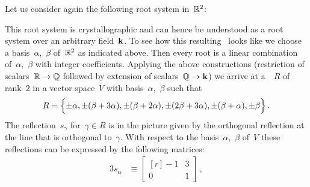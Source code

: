 \begin{example}
  Let us consider again the following root system in~$\mathbb{R}^2$:
  \begin{center}
  \end{center}
  This root system is crystallographic and can hence be understood as a root system over an arbitrary field~$\kf$.
  To see how this resulting~{\rootsystem{$\kf$}} looks like we choose a basis~$\alpha$,~$\beta$ of~$\mathbb{R}^2$ as indicated above.
  Then every root is a linear combination of~$\alpha$,~$\beta$ with integer coefficients.
  Applying the above constructions (restriction of scalars~$\mathbb{R} \to \mathbb{Q}$ followed by extension of scalars~$\mathbb{Q} \to \mathbf{k}$) we arrive at a~{\rootsystem{$\kf$}}~$R$ of rank~$2$ in a vector space~$V$ with basis~$\alpha$,~$\beta$ such that
  \[
    R
    =
    \Bigl\{
      \pm \alpha,
      \pm (\beta + 3 \alpha),
      \pm (\beta + 2 \alpha),
      \pm (2 \beta + 3 \alpha),
      \pm (\beta + \alpha),
      \pm \beta
    \Bigr\} \,.
  \]
  The reflection~$s_{\gamma}$ for~$\gamma \in R$ is in the picture given by the orthogonal reflection at the line that is orthogonal to~$\gamma$.
  With respect to the basis~$\alpha$,~$\beta$ of~$V$ these reflections can be expressed by the following matrices:
  \begin{alignat*}{3}
    s_\alpha
    &\equiv
    \begin{bmatrix*}[r]
      -1  & 3 \\
       0  & 1
    \end{bmatrix*} \,,

\end{alignat*}
\end{example}
